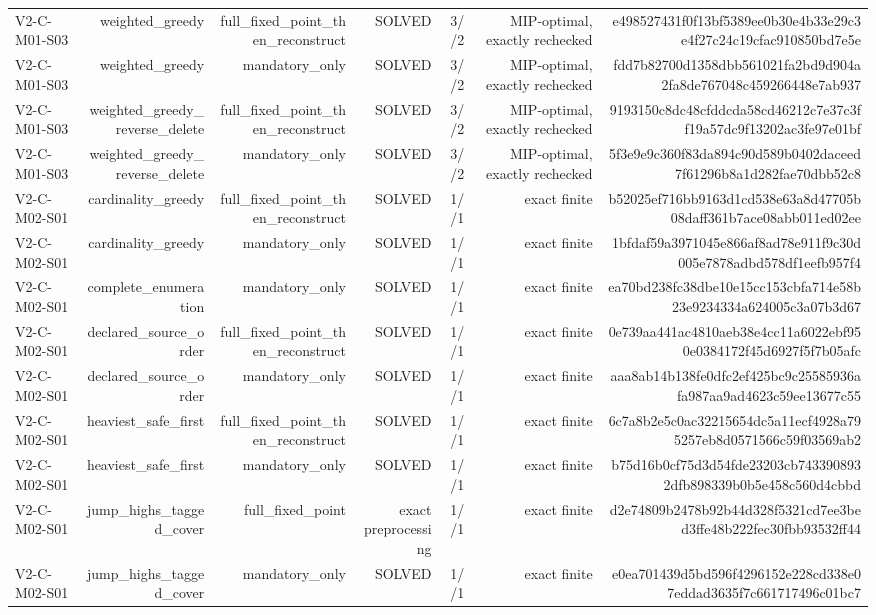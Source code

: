 {\begin{longtable}{lrrrrrr}
V2-C-M01-S03 & weighted\_greedy & full\_fixed\_point\_then\_reconstruct & SOLVED & 3//2 & MIP-optimal, exactly rechecked & e498527431f0f13bf5389ee0b30e4b33e29c3e4f27c24c19cfac910850bd7e5e \\
V2-C-M01-S03 & weighted\_greedy & mandatory\_only & SOLVED & 3//2 & MIP-optimal, exactly rechecked & fdd7b82700d1358dbb561021fa2bd9d904a2fa8de767048c459266448e7ab937 \\
V2-C-M01-S03 & weighted\_greedy\_reverse\_delete & full\_fixed\_point\_then\_reconstruct & SOLVED & 3//2 & MIP-optimal, exactly rechecked & 9193150c8dc48cfddcda58cd46212c7e37c3ff19a57dc9f13202ac3fe97e01bf \\
V2-C-M01-S03 & weighted\_greedy\_reverse\_delete & mandatory\_only & SOLVED & 3//2 & MIP-optimal, exactly rechecked & 5f3e9e9c360f83da894c90d589b0402daceed7f61296b8a1d282fae70dbb52c8 \\
V2-C-M02-S01 & cardinality\_greedy & full\_fixed\_point\_then\_reconstruct & SOLVED & 1//1 & exact finite & b52025ef716bb9163d1cd538e63a8d47705b08daff361b7ace08abb011ed02ee \\
V2-C-M02-S01 & cardinality\_greedy & mandatory\_only & SOLVED & 1//1 & exact finite & 1bfdaf59a3971045e866af8ad78e911f9c30d005e7878adbd578df1eefb957f4 \\
V2-C-M02-S01 & complete\_enumeration & mandatory\_only & SOLVED & 1//1 & exact finite & ea70bd238fc38dbe10e15cc153cbfa714e58b23e9234334a624005c3a07b3d67 \\
V2-C-M02-S01 & declared\_source\_order & full\_fixed\_point\_then\_reconstruct & SOLVED & 1//1 & exact finite & 0e739aa441ac4810aeb38e4cc11a6022ebf950e0384172f45d6927f5f7b05afc \\
V2-C-M02-S01 & declared\_source\_order & mandatory\_only & SOLVED & 1//1 & exact finite & aaa8ab14b138fe0dfc2ef425bc9c25585936afa987aa9ad4623c59ee13677c55 \\
V2-C-M02-S01 & heaviest\_safe\_first & full\_fixed\_point\_then\_reconstruct & SOLVED & 1//1 & exact finite & 6c7a8b2e5c0ac32215654dc5a11ecf4928a795257eb8d0571566c59f03569ab2 \\
V2-C-M02-S01 & heaviest\_safe\_first & mandatory\_only & SOLVED & 1//1 & exact finite & b75d16b0cf75d3d54fde23203cb7433908932dfb898339b0b5e458c560d4cbbd \\
V2-C-M02-S01 & jump\_highs\_tagged\_cover & full\_fixed\_point & exact preprocessing & 1//1 & exact finite & d2e74809b2478b92b44d328f5321cd7ee3bed3ffe48b222fec30fbb93532ff44 \\
V2-C-M02-S01 & jump\_highs\_tagged\_cover & mandatory\_only & SOLVED & 1//1 & exact finite & e0ea701439d5bd596f4296152e228cd338e07eddad3635f7c661717496c01bc7 \\

\end{longtable}}
